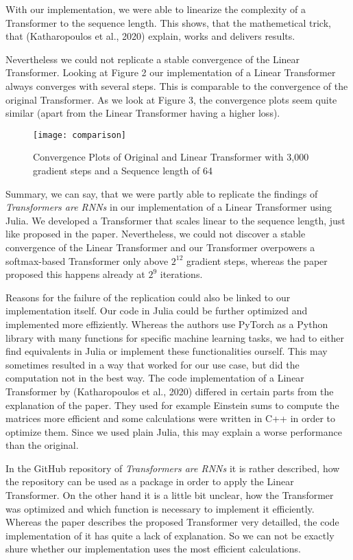 \documentclass[DIV=13,fontsize=11pt]{scrartcl}
\begin{document}
With our implementation, we were able to linearize the complexity of a Transformer to the sequence length. This shows, that the mathemetical trick, that (Katharopoulos et al., 2020) explain, works and delivers results. 

Nevertheless we could not replicate a stable convergence of the Linear Transformer. Looking at Figure 2 our implementation of a Linear Transformer always converges with several steps. This is comparable to the convergence of the original Transformer. As we look at Figure 3, the convergence plots seem quite similar (apart from the Linear Transformer having a higher loss).

\begin{figure}[h]
    \centering
    \texttt{[image: comparison]}
    \caption{Convergence Plots of Original and Linear Transformer with 3,000 gradient steps and a Sequence length of 64}
    \label{fig:mesh1}
\end{figure}

Summary, we can say, that we were partly able to replicate the findings of  \textit{Transformers are RNNs} in our implementation of a Linear Transformer using Julia. We developed a Transformer that scales linear to the sequence length, just like proposed in the paper. Nevertheless, we could not discover a stable convergence of the Linear Transformer and our Transformer overpowers a softmax-based Transformer only above \(2^{12}\) gradient steps, whereas the paper proposed this happens already at \(2^{9}\) iterations. 

Reasons for the failure of the replication could also be linked to our implementation itself. Our code in Julia could be further optimized and implemented more effiziently. Whereas the authors use PyTorch as a Python library with many functions for specific machine learning tasks, we had to either find equivalents in Julia or implement these functionalities ourself. This may sometimes resulted in a way that worked for our use case, but did the computation not in the best way. The code implementation of a Linear Transformer by (Katharopoulos et al., 2020) differed in certain parts from the explanation of the paper. They used for example Einstein sums to compute the matrices more efficient and some calculations were written in C++ in order to optimize them. Since we used plain Julia, this may explain a worse performance than the original. 

In the GitHub repository of \textit{Transformers are RNNs} it is rather described, how the repository can be used as a package in order to apply the Linear Transformer. On the other hand it is a little bit unclear, how the Transformer was optimized and which function is necessary to implement it efficiently. Whereas the paper describes the proposed Transformer very detailled, the code implementation of it has quite a lack of explanation.  So we can not be exactly shure whether our implementation uses the most efficient calculations.
\end{document}
